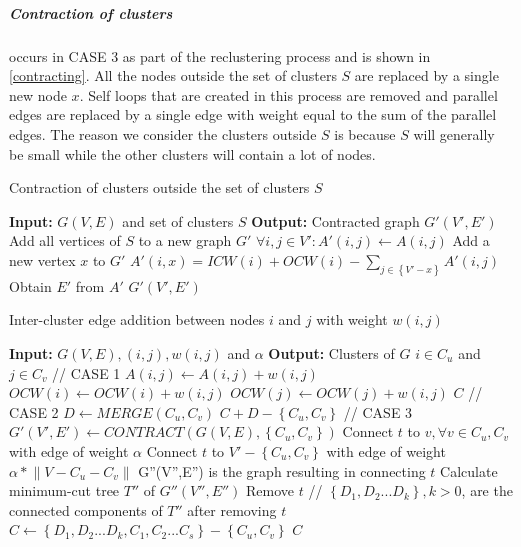 \subparagraph{Contraction of clusters} occurs in CASE 3 as part of the reclustering process and is shown in \ref{contracting}. All the nodes outside the set of clusters $S$ are replaced by a single new node $x$. Self loops that are created in this process are removed and parallel edges are replaced by a single edge with weight equal to the sum of the parallel edges. The reason we consider the clusters outside $S$ is because $S$ will generally be small while the other clusters will contain a lot of nodes.

\begin{algorithm}
\caption{Contraction of clusters outside the set of clusters $S$}
\label{contracting}
\begin{algorithmic}
\STATE \textbf{Input:} $G(V,E)$ and set of clusters $S$ 
\STATE \textbf{Output:} Contracted graph $G'(V',E')$
\STATE Add all vertices of $S$ to a new graph $G'$
\STATE $\forall i,j \in V' : A'(i,j) \leftarrow A(i,j)$
\STATE Add a new vertex $x$ to $G'$
	\STATE $A'(i,x) = ICW(i) + OCW(i) - \sum_{j \in \left\{ V' - x \right\} }{A'(i,j)}$
\ENDFOR
\STATE Obtain $E'$ from $A'$
\RETURN $G'(V',E')$
\end{algorithmic}
\end{algorithm}


\begin{algorithm}
\caption{Inter-cluster edge addition between nodes $i$ and $j$ with weight $w(i,j)$}
\label{intercluster}
\begin{algorithmic}
\STATE \textbf{Input:} $G(V,E), (i,j), w(i,j)$ and $\alpha$ 
\STATE \textbf{Output:} Clusters of $G$
\STATE $i \in C_u$ and $j \in C_v$
	\STATE // CASE 1
	\STATE $A(i,j) \leftarrow A(i,j) + w(i,j)$
	\STATE $OCW(i) \leftarrow OCW(i) + w(i,j)$
	\STATE $OCW(j) \leftarrow OCW(j) + w(i,j)$
	\RETURN $C$
	\STATE // CASE 2
	\STATE $D \leftarrow MERGE(C_u,C_v)$
	\RETURN $C + D - \left\{C_u,C_v\right\}$
\ELSE
	\STATE // CASE 3
	\STATE $G'(V',E') \leftarrow CONTRACT(G(V,E),\left\{C_u,C_v\right\} )$
	\STATE Connect $t$ to $v, \forall v \in C_u,C_v$ with edge of weight $\alpha$
	\STATE Connect $t$ to $V' - \left\{C_u, C_v\right\}$ with edge of weight $\alpha * \left\| V - C_u - C_v \right\|$
	\STATE G''(V'',E'') is the graph resulting in connecting $t$
	\STATE Calculate minimum-cut tree $T''$ of $G''(V'',E'')$
	\STATE Remove $t$
	\STATE // $\left\{D_1,D_2...D_k\right\}, k > 0$, are the connected components of $T''$ after removing $t$
	\STATE $C \leftarrow \left\{D_1,D_2...D_k,C_1,C_2...C_s\right\} - \left\{ C_u,C_v \right\}$
	\RETURN $C$
\ENDIF
\end{algorithmic}
\end{algorithm}
